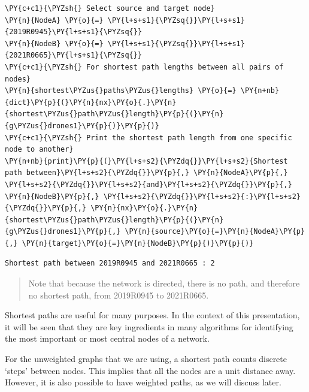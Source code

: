     \begin{tcolorbox}[breakable, size=fbox, boxrule=1pt, pad at break*=1mm,colback=cellbackground, colframe=cellborder]
\begin{Verbatim}[commandchars=\\\{\}]
\PY{c+c1}{\PYZsh{} Select source and target node}
\PY{n}{NodeA} \PY{o}{=} \PY{l+s+s1}{\PYZsq{}}\PY{l+s+s1}{2019R0945}\PY{l+s+s1}{\PYZsq{}}
\PY{n}{NodeB} \PY{o}{=} \PY{l+s+s1}{\PYZsq{}}\PY{l+s+s1}{2021R0665}\PY{l+s+s1}{\PYZsq{}}
\PY{c+c1}{\PYZsh{} For shortest path lengths between all pairs of nodes}
\PY{n}{shortest\PYZus{}paths\PYZus{}lengths} \PY{o}{=} \PY{n+nb}{dict}\PY{p}{(}\PY{n}{nx}\PY{o}{.}\PY{n}{shortest\PYZus{}path\PYZus{}length}\PY{p}{(}\PY{n}{g\PYZus{}drones1}\PY{p}{)}\PY{p}{)}
\PY{c+c1}{\PYZsh{} Print the shortest path length from one specific node to another}
\PY{n+nb}{print}\PY{p}{(}\PY{l+s+s2}{\PYZdq{}}\PY{l+s+s2}{Shortest path between}\PY{l+s+s2}{\PYZdq{}}\PY{p}{,} \PY{n}{NodeA}\PY{p}{,} \PY{l+s+s2}{\PYZdq{}}\PY{l+s+s2}{and}\PY{l+s+s2}{\PYZdq{}}\PY{p}{,} \PY{n}{NodeB}\PY{p}{,} \PY{l+s+s2}{\PYZdq{}}\PY{l+s+s2}{:}\PY{l+s+s2}{\PYZdq{}}\PY{p}{,} \PY{n}{nx}\PY{o}{.}\PY{n}{shortest\PYZus{}path\PYZus{}length}\PY{p}{(}\PY{n}{g\PYZus{}drones1}\PY{p}{,} \PY{n}{source}\PY{o}{=}\PY{n}{NodeA}\PY{p}{,} \PY{n}{target}\PY{o}{=}\PY{n}{NodeB}\PY{p}{)}\PY{p}{)}
\end{Verbatim}
\end{tcolorbox}

    \begin{Verbatim}[commandchars=\\\{\}]
Shortest path between 2019R0945 and 2021R0665 : 2
    \end{Verbatim}

    \begin{quote}
Note that because the network is directed, there is no path, and
therefore no shortest path, from 2019R0945 to 2021R0665.
\end{quote}

    Shortest paths are useful for many purposes. In the context of this
presentation, it will be seen that they are key ingredients in many
algorithms for identifying the most important or most central nodes of a
network.

For the unweighted graphs that we are using, a shortest path counts
discrete `steps' between nodes. This implies that all the nodes are a
unit distance away. However, it is also possible to have weighted paths,
as we will discuss later.

